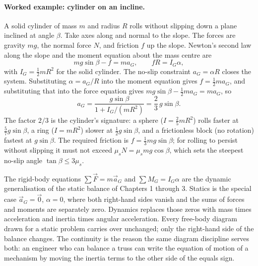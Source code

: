 

\paragraph{Worked example: cylinder on an incline.} A solid cylinder
of mass $m$ and radius $R$ rolls without slipping down a plane
inclined at angle $\beta$. Take axes along and normal to the slope.
The forces are gravity $mg$, the normal force $N$, and friction $f$ up
the slope. Newton's second law along the slope and the moment equation
about the mass centre are
\[
mg\sin\beta - f = m a_{G}, \qquad fR = I_{G}\alpha,
\]
with $I_{G}=\tfrac{1}{2}mR^{2}$ for the solid cylinder. The no-slip
constraint $a_{G}=\alpha R$ closes the system. Substituting $\alpha =
a_{G}/R$ into the moment equation gives $f=\tfrac{1}{2}m a_{G}$, and
substituting that into the force equation gives $mg\sin\beta -
\tfrac{1}{2}m a_{G}=m a_{G}$, so
\[
a_{G}=\frac{g\sin\beta}{1+I_{G}/(mR^{2})}=\frac{2}{3}\,g\sin\beta.
\]
The factor $2/3$ is the cylinder's signature: a sphere
($I=\tfrac{2}{5}mR^{2}$) rolls faster at $\tfrac{5}{7}g\sin\beta$, a
ring ($I=mR^{2}$) slower at $\tfrac{1}{2}g\sin\beta$, and a
frictionless block (no rotation) fastest at $g\sin\beta$. The required
friction is $f=\tfrac{1}{3}mg\sin\beta$; for rolling to persist
without slipping it must not exceed $\mu_{s}N=\mu_{s}mg\cos\beta$,
which sets the steepest no-slip angle $\tan\beta\le 3\mu_{s}$.

\begin{archetype}[balance]
The rigid-body equations $\sum\vec{F}=m\vec{a}_{G}$ and $\sum M_{G}=
I_{G}\alpha$ are the dynamic generalisation of the static balance of
Chapters 1 through 3. Statics is the special case $\vec{a}_{G}=\vec{0}$,
$\alpha=0$, where both right-hand sides vanish and the sums of forces
and moments are separately zero. Dynamics replaces those zeros with
mass times acceleration and inertia times angular acceleration. Every
free-body diagram drawn for a static problem carries over unchanged;
only the right-hand side of the balance changes. The continuity is the
reason the same diagram discipline serves both: an engineer who can
balance a truss can write the equation of motion of a mechanism by
moving the inertia terms to the other side of the equals sign.
\end{archetype}

